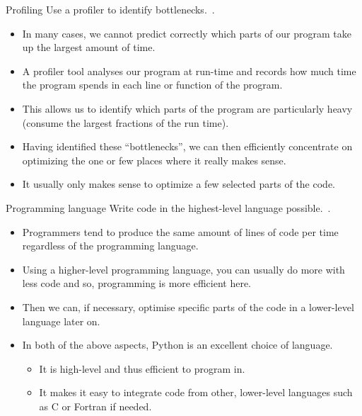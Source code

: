\documentclass[english]{beamer}
\begin{document}

\begin{frame}{\insertsection}{Profiling}
  Use a profiler to identify bottlenecks.~\cite{Wilson2013}.
  \begin{itemize}
  \item In many cases, we cannot predict correctly which parts of our
    program take up the largest amount of time.
  \item A profiler tool analyses our program at run-time and records
    how much time the program spends in each line or function of the
    program.
  \item This allows us to identify which parts of the program are
    particularly heavy (consume the largest fractions of the run
    time).
  \item Having identified these ``bottlenecks'', we can then
    efficiently concentrate on optimizing the one or few places where
    it really makes sense.
  \item It usually only makes sense to optimize a few selected parts
    of the code.
  \end{itemize}
\end{frame}


\begin{frame}{\insertsection}{Programming language}
  Write code in the highest-level language
  possible.~\cite{Wilson2013}.
  \begin{itemize}
  \item Programmers tend to produce the same amount of lines of code
    per time regardless of the programming language.
  \item Using a higher-level programming language, you can usually do
    more with less code and so, programming is more efficient here.
  \item Then we can, if necessary, optimise specific parts of the code
    in a lower-level language later on.
  \item In both of the above aspects, Python is an excellent choice of
    language.
    \begin{itemize}
    \item It is high-level and thus efficient to program in.
    \item It makes it easy to integrate code from other, lower-level
      languages such as C or Fortran if needed.
    \end{itemize}
  \end{itemize}
\end{frame}
\end{document}
